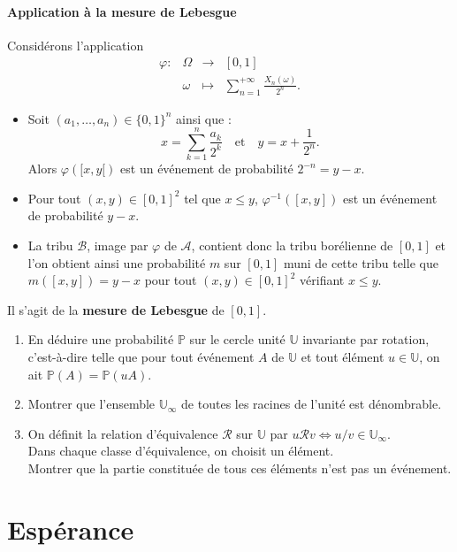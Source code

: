 \documentclass[french]{article}
\renewcommand{\P}{\mathbb{P}}
\newcommand{\U}{\mathbb{U}}
\newcommand{\inv}{^{-1}}
\theoremstyle{plain}
\theoremstyle{definition}
\theoremstyle{remark}
\begin{document}
\paragraph{Application à la mesure de Lebesgue}
Considérons l'application $$\begin{array}{lrcl}
	\varphi:&\Omega&\longrightarrow&[0,1]\\
	&\omega&\longmapsto&\displaystyle\sum_{n=1}^{+\infty}\frac{X_n(\omega)}{2^n}.
\end{array}$$
\begin{itemize}
	\item Soit $(a_1,\ldots,a_n)\in\{0,1\}^n$ ainsi que : $$x=\sum_{k=1}^{n}\frac{a_k}{2^k}\quad\text{et}\quad y=x+\frac{1}{2^n}.$$
	Alors $\varphi([x,y[)$ est un événement de probabilité $2^{-n}=y-x$.
	\item Pour tout $(x,y)\in[0,1]^2$ tel que $x\leqslant y$, $\varphi\inv([x,y])$ est un événement de probabilité $y-x$.
	\item La tribu $\mathcal{B}$, image par $\varphi$ de $\mathcal{A}$, contient donc la tribu borélienne de $[0,1]$ et l'on obtient ainsi une probabilité $m$ sur $[0,1]$ muni de cette tribu telle que $m([x,y])=y-x$ pour tout $(x,y)\in[0,1]^2$ vérifiant $x\leqslant y$.
\end{itemize}
Il s'agit de la \textbf{mesure de Lebesgue} de $[0,1]$.

\begin{exo}[$\star\star$]
	\begin{enumerate}
		\item En déduire une probabilité $\P$ sur le cercle unité $\U$ invariante par rotation, c'est-à-dire telle que pour tout événement $A$ de $\U$ et tout élément $u\in\U$, on ait $\P(A)=\P(uA)$.
		\item Montrer que l'ensemble $\U_\infty$ de toutes les racines de l'unité est dénombrable.
		\item On définit la relation d'équivalence $\mathcal{R}$ sur $\U$ par $u\mathcal{R}v\iff u/v\in\U_\infty$.\\
		Dans chaque classe d'équivalence, on choisit un élément.\\
		Montrer que la partie constituée de tous ces éléments n'est pas un événement.
	\end{enumerate}
\end{exo}

\section{Espérance}
\end{document}
